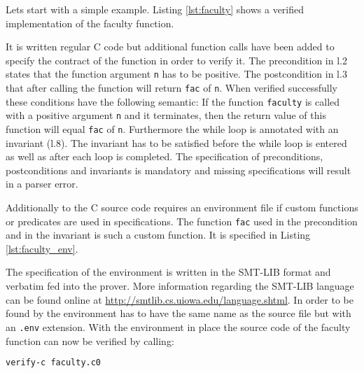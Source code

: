 \documentclass[12pt]{article}
\begin{document}
Lets start with a simple example. Listing \ref{lst:faculty} shows a verified implementation of the faculty function.

\begin{minipage}{\linewidth}

\end{minipage}

It is written regular C code but additional function calls have been added to specify the contract of the function in order to verify it. 
The precondition in l.2 states that the function argument \texttt{n} has to be positive. 
The postcondition in l.3 that after calling the function will return \texttt{fac} of \texttt{n}.
When verified successfully these conditions have the following semantic: 
If the function \texttt{faculty} is called with a positive argument \texttt{n} and it terminates, then the return value of this function will equal \texttt{fac} of \texttt{n}.
Furthermore the while loop is annotated with an invariant (l.8).
The invariant has to be satisfied before the while loop is entered as well as after each loop is completed.
The specification of preconditions, postconditions and invariants is mandatory and missing specifications will result in a parser error.

Additionally to the C source code \verifyc requires an environment file if custom functions or predicates are used in specifications. 
The function \texttt{fac} used in the precondition and in the invariant is such a custom function.
It is specified in Listing \ref{lst:faculty_env}.

\begin{minipage}{\linewidth}

\end{minipage}

The specification of the environment is written in the SMT-LIB format and verbatim fed into the \zthree prover.
More information regarding the SMT-LIB language can be found online at \url{http://smtlib.cs.uiowa.edu/language.shtml}. In order to be found by \verifyc the environment has to have the same name as the source file but with an \texttt{.env} extension.
With the environment in place the source code of the faculty function can now be verified by calling:

\begin{lstlisting}[language=bash]
verify-c faculty.c0
\end{lstlisting}
\end{document}
